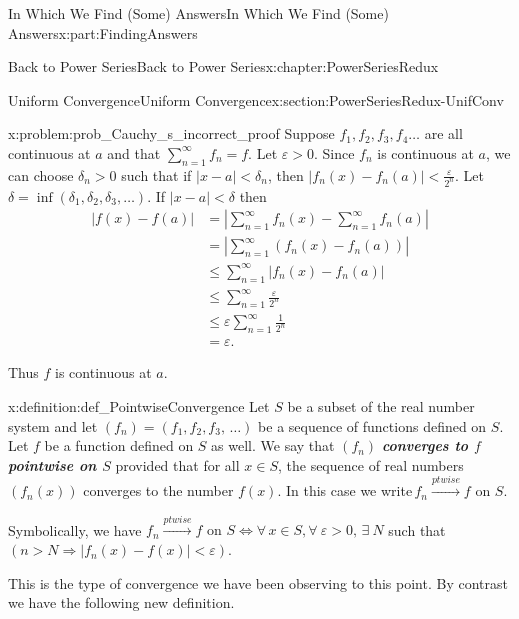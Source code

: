 \documentclass[oneside,10pt,]{book}
\newcommand{\alert}[1]{\textbf{\textit{#1}}}
\numberwithin{equation}{section}
\newcommand{\abs}[1]{\left|#1\right|}
\newcommand{\eps}{\varepsilon}
\newcommand{\ptwise}{\stackrel{ptwise}{\longrightarrow}}
\newcommand{\lt}{<}
\newcommand{\amp}{&}
\begin{document}
\begin{partptx}{In Which We Find (Some) Answers}{}{In Which We Find (Some) Answers}{}{}{x:part:FindingAnswers}
\begin{chapterptx}{Back to Power Series}{}{Back to Power Series}{}{}{x:chapter:PowerSeriesRedux}
\begin{sectionptx}{Uniform Convergence}{}{Uniform Convergence}{}{}{x:section:PowerSeriesRedux-UnifConv}
\begin{problem}{}{x:problem:prob_Cauchy_s_incorrect_proof}
Suppose \(f_1, f_2, f_3, f_4 \ldots\) are all continuous at \(a\) and that \(\sum_{n=1}^\infty f_n=f\). Let \(\eps>0\). Since \(f_n\) is continuous at \(a\), we can choose \(\delta_n>0\) such that if \(\abs{x-a}\lt \delta_n\), then \(\abs{f_n(x)-f_n(a)}\lt \frac{\eps}{2^n}\). Let \(\delta=\inf(\delta_1,\delta_2,\delta_3,\ldots)\). If \(\abs{x-a}\lt \delta\) then%
\begin{align*}
\abs{f(x)-f(a)} \amp =  \abs{\sum_{n=1}^\infty f_n(x)  -  \sum_{n=1}^\infty f_n(a) }\\
\amp = \abs{\sum_{n=1}^\infty \left(f_n(x)-f_n(a)\right) }\\
\amp \le \sum_{n=1}^\infty \abs{f_n(x)-f_n(a) }\\
\amp \le \sum_{n=1}^\infty \frac{\eps}{2^n}\\
\amp \le \eps\sum_{n=1}^\infty \frac{1}{2^n}\\
\amp =   \eps\text{.}
\end{align*}
%
\par
Thus \(f\) is continuous at \(a\).%
\end{problem}
\begin{definition}{}{x:definition:def_PointwiseConvergence}%
 Let \(S\) be a subset of the real number system and let \(\left(f_n\right)=\left(f_1,f_2,f_3,\,\ldots\right)\) be a sequence of functions defined on \(S\). Let \(f\) be a function defined on \(S\) as well. We say that  \(\left(f_n\right)\) \alert{converges to \(f\) pointwise on \(S\)} provided that for all \(x\in S\), the sequence of real numbers \(\left(f_n(x)\right)\) converges to the number \(f(x)\). In this case we write\(\,f_n\ptwise f\) on \(S\).%
\end{definition}
Symbolically, we have \(f_n\ptwise f\text{ on } S\Leftrightarrow \forall\,x\in S,\forall\ \eps>0,\,\exists\ N\) such that \(\left(n>N \Rightarrow|f_n(x)-f(x)|\lt \eps\right)\).%
\par
This is the type of convergence we have been observing to this point. By contrast we have the following new definition.%
\end{sectionptx}
\end{chapterptx}
\end{partptx}
\end{document}
